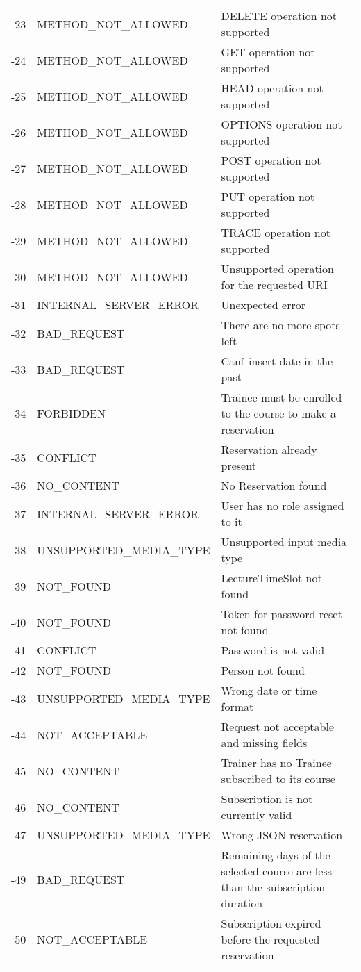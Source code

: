 \begin{longtable}{|p{}|p{} |p{}|}
	-23 &  METHOD\_NOT\_ALLOWED & DELETE operation not supported \\ 
	-24 &  METHOD\_NOT\_ALLOWED & GET operation not supported \\
	-25 &  METHOD\_NOT\_ALLOWED & HEAD operation not supported \\ 
	-26 &  METHOD\_NOT\_ALLOWED & OPTIONS operation not supported \\ 
	-27 &  METHOD\_NOT\_ALLOWED & POST operation not supported \\
	-28 &  METHOD\_NOT\_ALLOWED & PUT operation not supported \\
	-29 &  METHOD\_NOT\_ALLOWED & TRACE operation not supported \\ 
	-30 &  METHOD\_NOT\_ALLOWED & Unsupported operation for the requested URI \\ 
	-31 &  INTERNAL\_SERVER\_ERROR & Unexpected error \\
	-32 &  BAD\_REQUEST & There are no more spots left \\ 
	-33 &  BAD\_REQUEST & Can\'t insert date in the past \\
	-34 &  FORBIDDEN & Trainee must be enrolled to the course to make a reservation \\
	-35 &  CONFLICT & Reservation already present \\
	-36 &  NO\_CONTENT & No Reservation found \\
	-37 &  INTERNAL\_SERVER\_ERROR & User has no role assigned to it \\
	-38 &  UNSUPPORTED\_MEDIA\_TYPE & Unsupported input media type \\
	-39 &  NOT\_FOUND & LectureTimeSlot not found \\
	-40 &  NOT\_FOUND & Token for password reset not found \\
	-41 &  CONFLICT & Password is not valid \\
	-42 &  NOT\_FOUND & Person not found \\
	-43 &  UNSUPPORTED\_MEDIA\_TYPE & Wrong date or time format \\
	-44 &  NOT\_ACCEPTABLE & Request not acceptable and missing fields \\
	-45 &  NO\_CONTENT & Trainer has no Trainee subscribed to its course \\ 
	-46 &  NO\_CONTENT & Subscription is not currently valid \\
	-47 &  UNSUPPORTED\_MEDIA\_TYPE & Wrong JSON reservation \\
	-49 &  BAD\_REQUEST & Remaining days of the selected course are less than the subscription duration \\
	-50 & NOT\_ACCEPTABLE & Subscription expired before the requested reservation \\
	
\end{longtable}